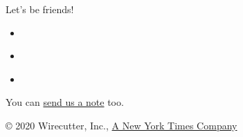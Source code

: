 Let's be friends!

\begin{itemize}
\tightlist
\item
  \href{https://www.facebook.com/thewirecutter/}{}
\item
  \href{https://www.instagram.com/wirecutter/}{}
\item
  \href{https://twitter.com/wirecutter/}{}
\end{itemize}

You can \href{/wirecutter/contact-us/}{send us a note} too.

© 2020 Wirecutter, Inc., \href{https://nytimes.com/}{A New York Times
Company}
